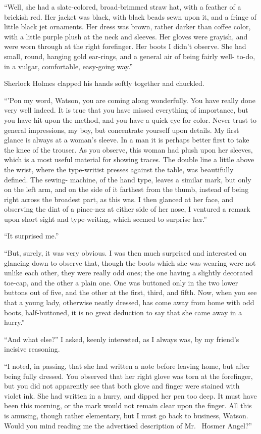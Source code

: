 “Well, she had a slate-colored, broad-brimmed straw hat,
with a feather of a brickish red. Her jacket was black, with
black beads sewn upon it, and a fringe of little black jet
ornaments. Her dress was brown, rather darker than coffee color,
with a little purple plush at the neck and sleeves. Her
gloves were grayish, and were worn through at the right
forefinger. Her boots I didn’t observe. She had small, round,
hanging gold ear-rings, and a general air of being fairly well-%
to-do, in a vulgar, comfortable, easy-going way.”

Sherlock Holmes clapped his hands softly together and
chuckled.

“’Pon my word, Watson, you are coming along wonderfully.
You have really done very well indeed. It is true that you
have missed everything of importance, but you have hit upon
the method, and you have a quick eye for color. Never trust
to general impressions, my boy, but concentrate yourself upon
details. My first glance is always at a woman’s sleeve. In a
man it is perhaps better first to take the knee of the trouser.
As you observe, this woman had plush upon her sleeves,
which is a most useful material for showing traces. The
double line a little above the wrist, where the type-writist
presses against the table, was beautifully defined. The sewing-%
machine, of the hand type, leaves a similar mark, but only
on the left arm, and on the side of it farthest from the thumb,
instead of being right across the broadest part, as this was.
I then glanced at her face, and observing the dint of a pince-nez
at either side of her nose, I ventured a remark upon short
sight and type-writing, which seemed to surprise her.”

“It surprised me.”

“But, surely, it was very obvious. I was then much surprised
and interested on glancing down to observe that,
though the boots which she was wearing were not unlike each
other, they were really odd ones; the one having a slightly
decorated toe-cap, and the other a plain one. One was buttoned
only in the two lower buttons out of five, and the other
at the first, third, and fifth. Now, when you see that a young
lady, otherwise neatly dressed, has come away from home
with odd boots, half-buttoned, it is no great deduction to say
that she came away in a hurry.”

“And what else?” I asked, keenly interested, as I always
was, by my friend’s incisive reasoning.

“I noted, in passing, that she had written a note before
leaving home, but after being fully dressed. You observed
that her right glove was torn at the forefinger, but you did not
apparently see that both glove and finger were stained with
violet ink. She had written in a hurry, and dipped her pen
too deep. It must have been this morning, or the mark would
not remain clear upon the finger. All this is amusing, though
rather elementary, but I must go back to business, Watson.
Would you mind reading me the advertised description of Mr.\ %
Hosmer Angel?”

